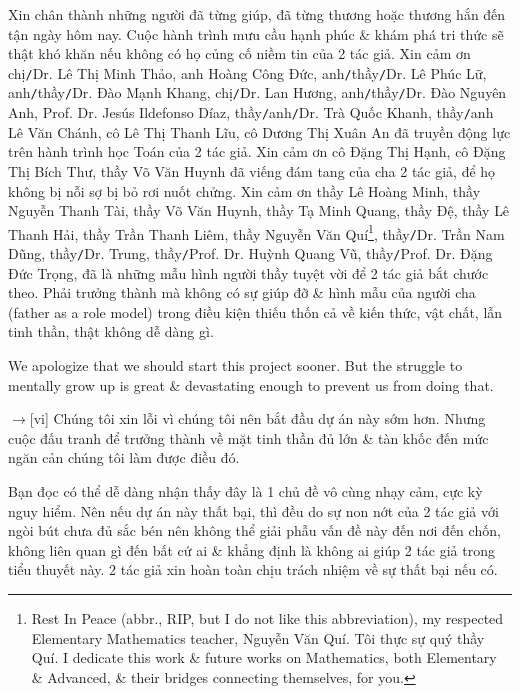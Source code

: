 \documentclass[12pt,twoside]{book}
\begin{document}
Xin chân thành những người đã từng giúp, đã từng thương hoặc thương hắn đến tận ngày hôm nay. Cuộc hành trình mưu cầu hạnh phúc \& khám phá tri thức sẽ thật khó khăn nếu không có họ củng cố niềm tin của 2 tác giả. Xin cảm ơn chị{\tt/}Dr. {\sc Lê Thị Minh Thảo}, anh {\sc Hoàng Công Đức}, anh{\tt/}thầy{\tt/}Dr. {\sc Lê Phúc Lữ}, anh{\tt/}thầy{\tt/}Dr.  {\sc Đào Mạnh Khang}, chị{\tt/}Dr.  {\sc Lan Hương}, anh{\tt/}thầy{\tt/}Dr.  {\sc Đào Nguyên Anh}, Prof. Dr. {\sc Jesús Ildefonso Díaz}, thầy{\tt/}anh{\tt/}Dr.  {\sc Trà Quốc Khanh}, thầy{\tt/}anh {\sc Lê Văn Chánh}, cô {\sc Lê Thị Thanh Lĩu}, cô {\sc Dương Thị Xuân An} đã truyền động lực trên hành trình học Toán của 2 tác giả. Xin cảm ơn cô {\sc Đặng Thị Hạnh}, cô {\sc Đặng Thị Bích Thư}, thầy {\sc Võ Văn Huynh} đã viếng đám tang của cha 2 tác giả, để họ không bị nỗi sợ bị bỏ rơi nuốt chửng. Xin cảm ơn thầy {\sc Lê Hoàng Minh}, thầy {\sc Nguyễn Thanh Tài}, thầy {\sc Võ Văn Huynh}, thầy {\sc Tạ Minh Quang}, thầy {\sc Đệ}, thầy {\sc Lê Thanh Hải}, thầy {\sc Trần Thanh Liêm}, thầy {\sc Nguyễn Văn Quí}\footnote{Rest In Peace (abbr., RIP, but I do not like this abbreviation), my respected Elementary Mathematics teacher, {\sc Nguyễn Văn Quí}. Tôi thực sự quý thầy {\sc Quí}. I dedicate this work \& future works on Mathematics, both Elementary \& Advanced, \& their bridges connecting themselves, for you.}, thầy{\tt/}Dr.  {\sc Trần Nam Dũng}, thầy{\tt/}Dr. {\sc Trung}, thầy{\tt/}Prof. Dr. {\sc Huỳnh Quang Vũ}, thầy{\tt/}Prof. Dr. {\sc Đặng Đức Trọng}, đã là những mẫu hình người thầy tuyệt vời để 2 tác giả bắt chước theo. Phải trưởng thành mà không có sự giúp đỡ \& hình mẫu của người cha (father as a role model) trong điều kiện thiếu thốn cả về kiến thức, vật chất, lẫn tinh thần, thật không dễ dàng gì.

We apologize that we should start this project sooner. But the struggle to mentally grow up is great \& devastating enough to prevent us from doing that.

{\sf[en]$\to$[vi]} Chúng tôi xin lỗi vì chúng tôi nên bắt đầu dự án này sớm hơn. Nhưng cuộc đấu tranh để trưởng thành về mặt tinh thần đủ lớn \& tàn khốc đến mức ngăn cản chúng tôi làm được điều đó.

Bạn đọc có thể dễ dàng nhận thấy đây là 1 chủ đề vô cùng nhạy cảm, cực kỳ nguy hiểm. Nên nếu dự án này thất bại, thì đều do sự non nớt của 2 tác giả với ngòi bút chưa đủ sắc bén nên không thể giải phẫu vấn đề này đến nơi đến chốn, không liên quan gì đến bất cứ ai \& khẳng định là không ai giúp 2 tác giả trong tiểu thuyết này. 2 tác giả xin hoàn toàn chịu trách nhiệm về sự thất bại nếu có.
\end{document}
